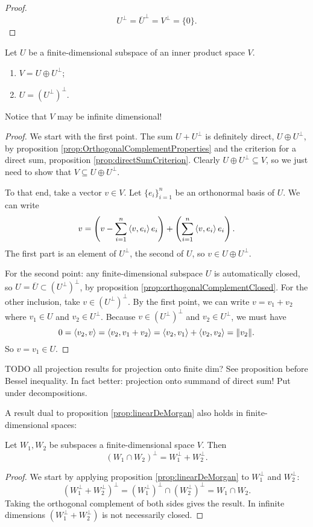 \begin{proof}
\[ U^\perp = \overline{U}^\perp = V^\perp = \{0\}. \]
\end{proof}
\begin{proposition}
Let $U$ be a finite-dimensional subspace of an inner product space $V$.
\begin{enumerate}
\item $V=U\oplus U^\perp$;
\item $U = (U^\perp)^\perp$.
\end{enumerate}
\end{proposition}
Notice that $V$ may be infinite dimensional!
\begin{proof}
We start with the first point. The sum $U + U^\perp$ is definitely direct, $U\oplus U^\perp$, by proposition \ref{prop:OrthogonalComplementProperties} and the criterion for a direct sum, proposition \ref{prop:directSumCriterion}. Clearly $U\oplus U^\perp\subseteq V$, so we just need to show that $V \subseteq U\oplus U^\perp$.

To that end, take a vector $v\in V$. Let $\{e_i\}_{i=1}^n$ be an orthonormal basis of $U$. We can write
\[ v = \left(v - \sum_{i=1}^n\left\langle v,e_i \right\rangle e_i\right) + \left(\sum_{i=1}^n\left\langle v,e_i \right\rangle e_i\right). \]
The first part is an element of $U^\perp$, the second of $U$, so $v\in U\oplus U^\perp$.

For the second point: any finite-dimensional subspace $U$ is automatically closed, so $U = \overline{U} \subset (U^\perp)^\perp$, by proposition \ref{prop:orthogonalComplementClosed}. For the other inclusion, take $v\in (U^\perp)^\perp$. By the first point, we can write $v = v_1 + v_2$ where $v_1\in U$ and $v_2\in U^\perp$. Because $v\in (U^\perp)^\perp$ and $v_2\in U^\perp$, we must have
\[ 0 = \left\langle v_2, v \right\rangle = \left\langle v_2, v_1+v_2 \right\rangle = \left\langle v_2, v_1 \right\rangle + \left\langle v_2,v_2 \right\rangle = \lVert v_2\rVert. \]
So $v=v_1\in U$.
\end{proof}

TODO all projection results for projection onto finite dim? See proposition before Bessel inequality. In fact better: projection onto summand of direct sum! Put under decompositions.


A result dual to proposition \ref{prop:linearDeMorgan} also holds in finite-dimensional spaces:
\begin{proposition}
Let $W_1,W_2$ be subspaces a finite-dimensional space $V$. Then
\[ (W_1\cap W_2)^\perp = W_1^\perp + W_2^\perp. \]
\end{proposition}
\begin{proof}
We start by applying proposition \ref{prop:linearDeMorgan} to $W_1^\perp$ and $W_2^\perp$:
\[ (W_1^\perp+W_2^\perp)^\perp = (W_1^\perp)^\perp \cap (W_2^\perp)^\perp = W_1 \cap W_2. \]
Taking the orthogonal complement of both sides gives the result. In infinite dimensions $(W_1^\perp+W_2^\perp)$ is not necessarily closed. 
\end{proof}



